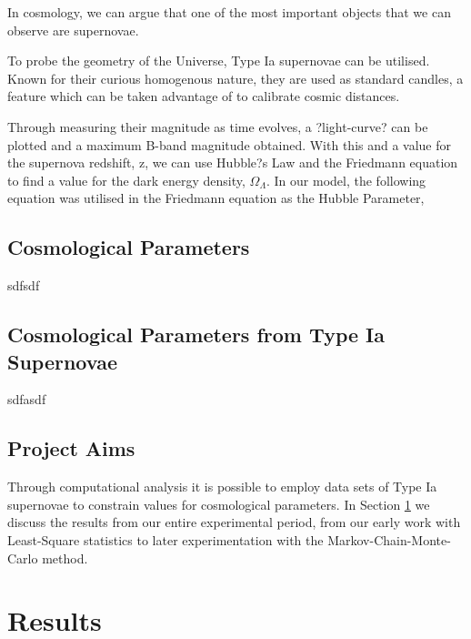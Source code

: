 \documentclass[twocolumn]{revtex4}
\begin{document}
In cosmology, we can argue that one of the most important objects that we can observe are supernovae.  \cite{obs_uni}

To probe the geometry of the Universe, Type Ia supernovae can be utilised. Known for their curious homogenous nature, they are used as standard candles, a feature which can be taken advantage of to calibrate cosmic distances. 

Through measuring their magnitude as time evolves, a ?light-curve? can be plotted and a maximum B-band magnitude obtained. With this and a value for the supernova redshift, z, we can use Hubble?s Law and the Friedmann equation to find a value for the dark energy density, $\Omega_{\Lambda}$. In our model, the following equation was utilised in the Friedmann equation as the Hubble Parameter,

\vspace{-3ex}
\subsection{Cosmological Parameters}
\vspace{-2ex}

sdfsdf

\vspace{-3ex}
\subsection{Cosmological Parameters from Type Ia Supernovae}
\vspace{-2ex}

sdfasdf

\vspace{-3ex}
\subsection{Project Aims}
\vspace{-2ex}

Through computational analysis it is possible to employ data sets of Type Ia supernovae to constrain values for cosmological parameters. In Section \ref{sec:results} we discuss the results from our entire experimental period, from our early work with Least-Square statistics to later experimentation with the Markov-Chain-Monte-Carlo method. 

\vspace{-3ex}
\section{Results} 
\label{sec:results}
\vspace{-2ex}
\end{document}
